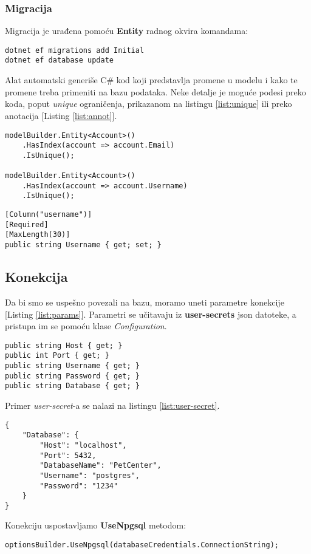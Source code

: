 \subsubsection*{Migracija}
\par Migracija je urađena pomoću \textbf{Entity} radnog okvira komandama:
\begin{lstlisting}[caption={Kreiranje migracije}, captionpos=b]
dotnet ef migrations add Initial
dotnet ef database update
\end{lstlisting}
\par Alat automatski generiše C\# kod koji predstavlja promene u modelu i kako te promene treba primeniti na bazu podataka. Neke detalje je moguće podesi preko 
koda, poput \textit{unique} ograničenja, prikazanom na listingu \ref{list:unique} ili preko anotacija [Listing \ref{list:annot}]. 
\begin{lstlisting}[caption={Primer postavljanja unique ograničenja}, label=list:unique, captionpos=b]
modelBuilder.Entity<Account>()
    .HasIndex(account => account.Email)
    .IsUnique();

modelBuilder.Entity<Account>()
    .HasIndex(account => account.Username)
    .IsUnique();
\end{lstlisting}
\begin{lstlisting}[caption={Primer postavljanja anotacija}, label=list:annot, captionpos=b]
[Column("username")]
[Required]
[MaxLength(30)]
public string Username { get; set; }
\end{lstlisting}
\subsection*{Konekcija}
\par Da bi smo se uspešno povezali na bazu, moramo uneti parametre konekcije [Listing \ref{list:params}]. Parametri se učitavaju iz
\textbf{user-secrets} json datoteke, a pristupa im se pomoću klase \textit{Configuration}.
\begin{lstlisting}[caption={Parametri konekcije}, captionpos=b, label={list:params}]
public string Host { get; }
public int Port { get; }
public string Username { get; }
public string Password { get; }
public string Database { get; }
\end{lstlisting}
\par Primer \textit{user-secret}-a se nalazi na listingu \ref{list:user-secret}.
\begin{lstlisting}[caption={Primer \textit{user-secret}}, captionpos=b, label={list:user-secret}]
{
    "Database": {
        "Host": "localhost",
        "Port": 5432,
        "DatabaseName": "PetCenter",
        "Username": "postgres",
        "Password": "1234"
    }
}
\end{lstlisting}
\par Konekciju uspostavljamo \textbf{UseNpgsql} metodom:
\begin{lstlisting}[caption={Uspostavljanje konekcije}, captionpos=b]
optionsBuilder.UseNpgsql(databaseCredentials.ConnectionString);
\end{lstlisting}
